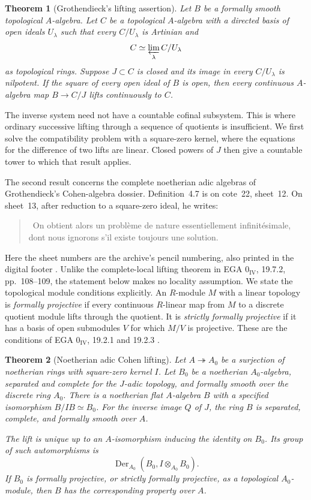 \documentclass[11pt]{article}
\newtheorem{theorem}{Theorem}[section]
\theoremstyle{definition}\newtheorem{definition}[theorem]{Definition}
\theoremstyle{remark}\newtheorem{remark}[theorem]{Remark}
\DeclareMathOperator{\Der}{Der}\DeclareMathOperator{\Spec}{Spec}\DeclareMathOperator{\gr}{gr}
\begin{document}
\begin{theorem}[Grothendieck's lifting assertion]\label{thm:proartinian}
Let $B$ be a formally smooth topological $A$-algebra. Let $C$ be a topological $A$-algebra with a directed basis of open ideals $U_\lambda$ such that every $C/U_\lambda$ is Artinian and
\[
 C\simeq\varprojlim_\lambda C/U_\lambda
\]
as topological rings. Suppose $J\subset C$ is closed and its image in every $C/U_\lambda$ is nilpotent. If the square of every open ideal of $B$ is open, then every continuous $A$-algebra map $B\to C/J$ lifts continuously to $C$.
\end{theorem}

The inverse system need not have a countable cofinal subsystem. This is where ordinary successive lifting through a sequence of quotients is insufficient. We first solve the compatibility problem with a square-zero kernel, where the equations for the difference of two lifts are linear. Closed powers of $J$ then give a countable tower to which that result applies.

The second result concerns the complete noetherian adic algebras of Grothendieck's Cohen-algebra dossier. Definition~4.7 is on cote~22, sheet~12. On sheet~13, after reduction to a square-zero ideal, he writes:
\begin{quote}
\guillemotleft\ On obtient alors un probl\`eme de nature essentiellement infinit\'esimale, dont nous ignorons s'il existe toujours une solution\guillemotright.
\end{quote}
Here the sheet numbers are the archive's pencil numbering, also printed in the digital footer \cite{Archive}. Unlike the complete-local lifting theorem in EGA $0_{\mathrm{IV}}$, 19.7.2, pp.~108--109, the statement below makes no locality assumption. We state the topological module conditions explicitly. An $R$-module $M$ with a linear topology is \emph{formally projective} if every continuous $R$-linear map from $M$ to a discrete quotient module lifts through the quotient. It is \emph{strictly formally projective} if it has a basis of open submodules $V$ for which $M/V$ is projective. These are the conditions of EGA $0_{\mathrm{IV}}$, 19.2.1 and 19.2.3 \cite{EGAIV1}.

\begin{theorem}[Noetherian adic Cohen lifting]\label{thm:adic}
Let $A\twoheadrightarrow A_0$ be a surjection of noetherian rings with square-zero kernel $I$. Let $B_0$ be a noetherian $A_0$-algebra, separated and complete for the $J$-adic topology, and formally smooth over the discrete ring $A_0$. There is a noetherian flat $A$-algebra $B$ with a specified isomorphism $B/IB\simeq B_0$. For the inverse image $Q$ of $J$, the ring $B$ is separated, complete, and formally smooth over $A$.

The lift is unique up to an $A$-isomorphism inducing the identity on $B_0$. Its group of such automorphisms is
\[
 \Der_{A_0}(B_0,I\otimes_{A_0}B_0).
\]
If $B_0$ is formally projective, or strictly formally projective, as a topological $A_0$-module, then $B$ has the corresponding property over $A$.
\end{theorem}
\end{document}

